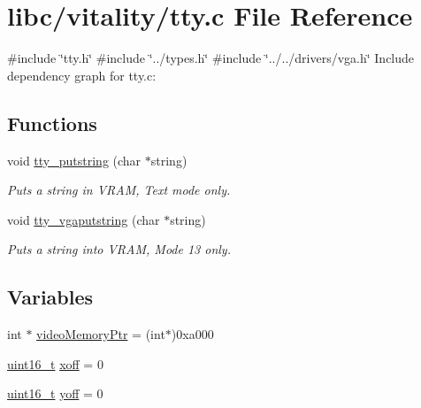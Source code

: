 \hypertarget{a00032}{}\section{libc/vitality/tty.c File Reference}
\label{a00032}
{\ttfamily \#include \char`\"{}tty.\+h\char`\"{}}\newline
{\ttfamily \#include \char`\"{}../types.\+h\char`\"{}}\newline
{\ttfamily \#include \char`\"{}../../drivers/vga.\+h\char`\"{}}\newline
Include dependency graph for tty.\+c\+:
\subsection*{Functions}
\begin{DoxyCompactItemize}
\item 
void \hyperlink{a00032_a2ebb962f457a2677d70285d1c0f9be12_a2ebb962f457a2677d70285d1c0f9be12}{tty\+\_\+putstring} (char $\ast$string)
\begin{DoxyCompactList}\small\item\em Puts a string in V\+R\+AM, Text mode only. \end{DoxyCompactList}\item 
void \hyperlink{a00032_a13ff2c06d56753c5666ca56cb2d81100_a13ff2c06d56753c5666ca56cb2d81100}{tty\+\_\+vgaputstring} (char $\ast$string)
\begin{DoxyCompactList}\small\item\em Puts a string into V\+R\+AM, Mode 13 only. \end{DoxyCompactList}\end{DoxyCompactItemize}
\subsection*{Variables}
\begin{DoxyCompactItemize}
\item 
int $\ast$ \hyperlink{a00032_a3f896e9c00b9302e2287aad054199134_a3f896e9c00b9302e2287aad054199134}{video\+Memory\+Ptr} = (int$\ast$)0xa000
\item 
\hyperlink{a00026_a273cf69d639a59973b6019625df33e30_a273cf69d639a59973b6019625df33e30}{uint16\+\_\+t} \hyperlink{a00032_abaa0d20f0e52ce0d3a7d706f6ac16266_abaa0d20f0e52ce0d3a7d706f6ac16266}{xoff} = 0
\item 
\hyperlink{a00026_a273cf69d639a59973b6019625df33e30_a273cf69d639a59973b6019625df33e30}{uint16\+\_\+t} \hyperlink{a00032_a1a7539764d0ae8cd06ce45c62cf92bca_a1a7539764d0ae8cd06ce45c62cf92bca}{yoff} = 0
\end{DoxyCompactItemize}


